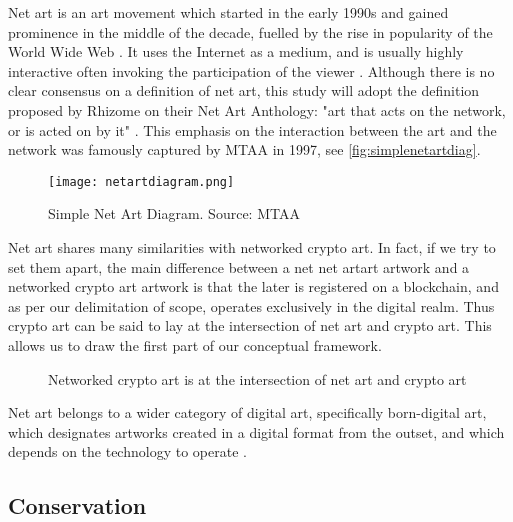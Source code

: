Net art is an art movement which started in the early 1990s and gained prominence in the middle of the decade, fuelled by the rise in popularity of the World Wide Web \cite{schreiberNetArtShedding2001}. It uses the Internet as a medium, and is usually highly interactive often invoking the participation of the viewer \cite{kholeifInternet_ArtBirthWeb2023}. Although there is no clear consensus on a definition of net art, this study will adopt the definition proposed by Rhizome on their Net Art Anthology: "art that acts on the network, or is acted on by it" \cite{WhatNetArt2017}.
This emphasis on the interaction between the art and the network was famously captured by MTAA in 1997, see \autoref{fig:simplenetartdiag}.

\begin{figure}[h]
    \centering
    \captionsetup{justification=centering}
    \texttt{[image: netartdiagram.png]}
    \caption[Simple Net Art Diagram]{Simple Net Art Diagram. Source: MTAA \cite{NETARTANTHOLOGY2016a}}
    \label{fig:simplenetartdiag}
\end{figure}

Net art shares many similarities with networked crypto art. In fact, if we try to set them apart, the main difference between a net net artart artwork and a networked crypto art artwork is that the later is registered on a blockchain, and as per our delimitation of scope, operates exclusively in the digital realm. Thus crypto art can be said to lay at the intersection of net art and crypto art. This allows us to draw the first part of our conceptual framework.


\begin{figure}[h]
    \centering
    \captionsetup{justification=centering}
    
    \caption[Networked crypto art at the intersection of net art and crypto art]{Networked crypto art is at the intersection of net art and crypto art}
    \label{fig:netart-crypto-art}
\end{figure}

Net art belongs to a wider category of digital art, specifically born-digital art, which designates artworks created in a digital format from the outset, and which depends on the technology to operate \cite{innocentiKeepingBitsAlive2013}.

\subsection{Conservation}

